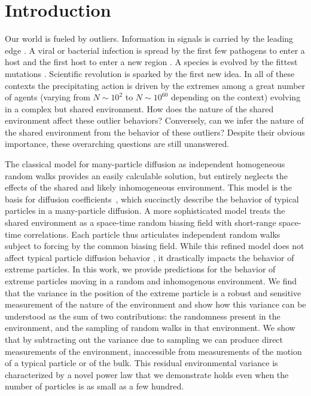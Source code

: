 \section{Introduction}
Our world is fueled by outliers. Information in signals is carried by the leading edge \cite{saxton_single-particle_1997,pinto_physics_2000, hofling_anomalous_2013, ghosh_non-universal_2015, manzo_review_2015,iyer-biswas_first_2015,metzler_non-brownian_2016,  shen_single_2017}.
A viral or bacterial infection is spread by the first few pathogens to enter a host and the first host to enter a new region \cite{hufnagel_forecast_2004,kao_virus_2006}.
A species is evolved by the fittest mutations \cite{ewens_mathematical_2012, metzler_first-passage_2014,waxman_diffusion_2017}. Scientific revolution is sparked by the first new idea. In all of these contexts the precipitating action is driven by the extremes among a great number of agents (varying from $N\sim 10^2$ to $N\sim 10^{60}$ depending on the context) evolving in a complex but shared environment. How does the nature of the shared environment affect these outlier behaviors? Conversely, can we infer the nature of the shared environment from the behavior of these outliers?  Despite their obvious importance, these overarching questions are still unanswered.

The classical model for many-particle diffusion as independent homogeneous random walks provides an easily calculable solution, but entirely neglects the effects of the shared and likely inhomogeneous environment. This model is the basis for diffusion coefficients~\cite{einstein_uber_1905,einstein_zur_1906, einstein_theoretische_1907}, which succinctly describe the behavior of typical particles in a many-particle diffusion. A more sophisticated model treats the shared environment as a space-time random biasing field with short-range space-time correlations. Each particle thus articulates independent random walks subject to forcing by the common biasing field. While this refined model does not affect typical particle diffusion behavior \cite{rassoul-agha_quenched_2013}, it drastically impacts the behavior of extreme particles. In this work, we provide predictions for the behavior of extreme particles moving in a random and inhomogenous environment.
We find that the variance in the position of the extreme particle is a robust and sensitive measurement of the nature of the environment and show how this variance can be understood as the sum of two contributions: the randomness present in the environment, and the sampling of random walks in that environment.  We show that by subtracting out the variance due to sampling we can produce direct measurements of the environment, inaccessible from measurements of the motion of a typical particle or of the bulk. This residual environmental variance is characterized by a novel power law that we demonstrate holds even when the number of particles is as small as a few hundred.

